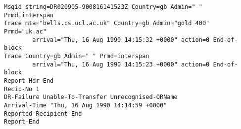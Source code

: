 \small\begin{verbatim}
Msgid string=DR020905-900816141523Z Country=gb Admin=" " Prmd=interspan
Trace mta="bells.cs.ucl.ac.uk" Country=gb Admin="gold 400" Prmd="uk.ac"
        arrival="Thu, 16 Aug 1990 14:15:32 +0000" action=0 End-of-block
Trace Country=gb Admin=" " Prmd=interspan
        arrival="Thu, 16 Aug 1990 14:15:23 +0000" action=0 End-of-block
Report-Hdr-End
Recip-No 1
DR-Failure Unable-To-Transfer Unrecognised-ORName
Arrival-Time "Thu, 16 Aug 1990 14:14:59 +0000"
Reported-Recipient-End
Report-End
\end{verbatim}
